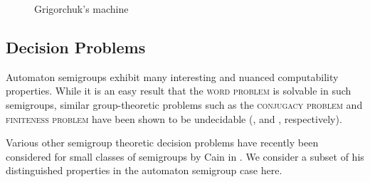 \documentclass[10pt]{article} %
\newcommand{\decprob}[1]{\textsc{#1}}
\begin{document}
    \begin{figure}
    \begin{center}
    \caption{Grigorchuk's machine}
    \end{center}
    \end{figure}

    \subsection*{Decision Problems}
    Automaton semigroups exhibit many interesting and nuanced
    computability properties. While it is an easy result that the
    \decprob{word problem} is solvable in such semigroups, similar
    group-theoretic problems such as the \decprob{conjugacy problem}
    and \decprob{finiteness problem} have been shown to be undecidable
    (\cite{sunic:conj}, and \cite{gillibert:finite}, respectively).

    Various other semigroup theoretic decision problems have recently
    been considered for small classes of semigroups by Cain in
    \cite{Cain09:dec_prob}. We consider a subset of his distinguished
    properties in the automaton semigroup case here.

\end{document}
